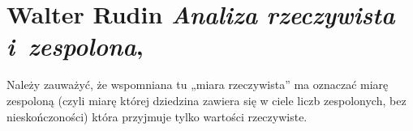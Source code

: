 \documentclass[a4paper,11pt]{article}
\numberwithin{equation}{section}
\begin{document}
\VerSpaceTwo













\newpage

\section{Walter Rudin \textit{Analiza rzeczywista
    i~zespolona},
  \cite{RudinAnalizaRzeczywistaIZespolona1998}}

\vspace{0em}



\vspace{0em}


\noindent
{} Należy zauważyć, że wspomniana tu „miara rzeczywista” ma oznaczać
miarę zespoloną (czyli miarę której dziedzina zawiera się w ciele liczb
zespolonych, bez nieskończoności) która przyjmuje tylko wartości
rzeczywiste.





\newpage

\end{document}
